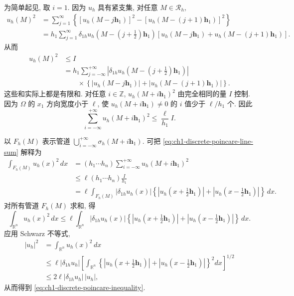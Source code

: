 \begin{Proof}
为简单起见, 取 $i=1$. 因为 $u_h$ 具有紧支集, 对任意 $M\in\mathcal R_h$,
\[
\begin{aligned}
u_h(M)^2
&=\sum_{j=1}^\infty\left\{[u_h(M-j\mathbf h_1)]^2
-[u_h(M-(j+1)\mathbf h_1)]^2\right\}\\
&=h_1\sum_{j=1}^\infty
\delta_{1h}u_h\left(M-\left(j+\frac12\right)\mathbf h_1\right)
\left[u_h(M-j\mathbf h_1)+u_h(M-(j+1)\mathbf h_1)\right].
\end{aligned}
\]
从而
\begin{equation}
\begin{aligned}
u_h(M)^2&\leq I\\
&=h_1\sum_{j=-\infty}^{+\infty}
\left|\delta_{1h}u_h\left(M-\left(j+\frac12\right)\mathbf h_1\right)\right|\\
&\qquad{}\times
\left\{|u_h(M-j\mathbf h_1)|+|u_h(M-(j+1)\mathbf h_1)|\right\}.
\end{aligned}
\label{eq:ch1-discrete-poincare-telescope}
\end{equation}
这些和实际上都是有限和. 对任意 $i\in\mathbb Z$, $u_h(M+i\mathbf h_1)^2$ 由完全相同的量 $I$ 控制. 因为 $\Omega$ 的 $x_1$ 方向宽度小于 $\ell$, 使 $u_h(M+i\mathbf h_1)\neq0$ 的 $i$ 值少于 $\ell/h_1$ 个. 因此
\begin{equation}
\sum_{i=-\infty}^{+\infty}u_h(M+i\mathbf h_1)^2
\leq\frac{\ell}{h_1}I.
\label{eq:ch1-discrete-poincare-line-sum}
\end{equation}

以 $F_h(M)$ 表示管道 $\bigcup_{i=-\infty}^{+\infty}\sigma_h(M+i\mathbf h_1)$. 可把 \eqref{eq:ch1-discrete-poincare-line-sum} 解释为
\[
\begin{aligned}
\int_{F_h(M)}u_h(x)^2\,dx
&=(h_1\cdots h_n)\sum_{i=-\infty}^{+\infty}u_h(M+i\mathbf h_1)^2\\
&\leq\ell(h_1\cdots h_n)\frac{I}{h_1}\\
&=\ell\int_{F_h(M)}|\delta_{1h}u_h(x)|
\left\{|u_h(x+\tfrac12\mathbf h_1)|+|u_h(x-\tfrac12\mathbf h_1)|\right\}\,dx.
\end{aligned}
\]
对所有管道 $F_h(M)$ 求和, 得
\[
\int_{\mathbb R^n}u_h(x)^2\,dx
\leq\ell\int_{\mathbb R^n}|\delta_{1h}u_h(x)|
\left\{|u_h(x+\tfrac12\mathbf h_1)|+|u_h(x-\tfrac12\mathbf h_1)|\right\}\,dx.
\]
应用 Schwarz 不等式,
\[
\begin{aligned}
|u_h|^2
&=\int_{\mathbb R^n}u_h(x)^2\,dx\\
&\leq\ell|\delta_{1h}u_h|
\left[\int_{\mathbb R^n}
\left\{|u_h(x+\tfrac12\mathbf h_1)|+|u_h(x-\tfrac12\mathbf h_1)|\right\}^2dx\right]^{1/2}\\
&\leq2\ell|\delta_{1h}u_h|\,|u_h|,
\end{aligned}
\]
从而得到 \eqref{eq:ch1-discrete-poincare-inequality}.
\end{Proof}

